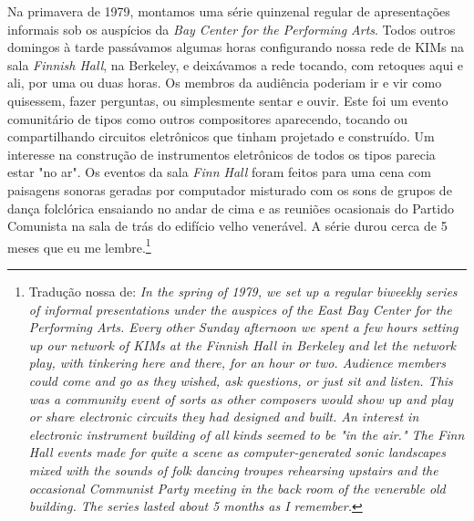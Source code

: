 \begin{citacao}
Na primavera de 1979, montamos uma série quinzenal regular de apresentações informais sob os auspícios da \emph{Bay Center for the Performing Arts}. Todos outros domingos à tarde passávamos algumas horas configurando nossa rede de KIMs na sala \emph{Finnish Hall}, na Berkeley, e deixávamos a rede tocando, com retoques aqui e ali, por uma ou duas horas. Os membros da audiência poderiam ir e vir como quisessem, fazer perguntas, ou simplesmente sentar e ouvir. Este foi um evento comunitário de tipos como outros compositores aparecendo, tocando ou compartilhando circuitos eletrônicos que tinham projetado e construído. Um interesse na construção de instrumentos eletrônicos de todos os tipos parecia estar "no ar". Os eventos da sala \emph{Finn Hall} foram feitos para uma cena com paisagens sonoras geradas por computador misturado com os sons de grupos de dança folclórica ensaiando no andar de cima e as reuniões ocasionais do Partido Comunista na sala de trás do edifício velho venerável. A série durou cerca de 5 meses que eu me lembre.\cite[online]{brown_indigenous_2013}\footnote{Tradução nossa de: \emph{In the spring of 1979, we set up a regular biweekly series of informal presentations under the auspices of the East Bay Center for the Performing Arts. Every other Sunday afternoon we spent a few hours setting up our network of KIMs at the Finnish Hall in Berkeley and let the network play, with tinkering here and there, for an hour or two. Audience members could come and go as they wished, ask questions, or just sit and listen. This was a community event of sorts as other composers would show up and play or share electronic circuits they had designed and built. An interest in electronic instrument building of all kinds seemed to be "in the air." The Finn Hall events made for quite a scene as computer-generated sonic landscapes mixed with the sounds of folk dancing troupes rehearsing upstairs and the occasional Communist Party meeting in the back room of the venerable old building. The series lasted about 5 months as I remember.}}
\end{citacao}

